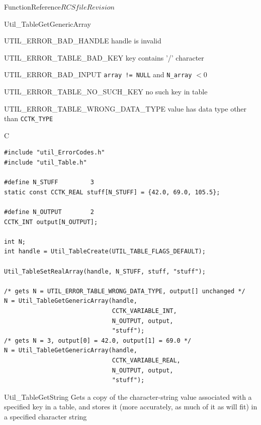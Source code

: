 \begin{cactuspart}{FunctionReference}{$RCSfile$}{$Revision$}
\begin{FunctionDescription}{Util\_TableGetGenericArray}
\begin{ErrorSection}
\begin{Error}{UTIL\_ERROR\_BAD\_HANDLE}
handle is invalid
\end{Error}
\begin{Error}{UTIL\_ERROR\_TABLE\_BAD\_KEY}
key contains '/' character
\end{Error}
\begin{Error}{UTIL\_ERROR\_BAD\_INPUT}
\verb|array != NULL| and \verb|N_array| $< 0$
\end{Error}
\begin{Error}{UTIL\_ERROR\_TABLE\_NO\_SUCH\_KEY}
no such key in table
\end{Error}
\begin{Error}{UTIL\_ERROR\_TABLE\_WRONG\_DATA\_TYPE}
value has data type other than \verb|CCTK_TYPE|
\end{Error}
\end{ErrorSection}

\begin{ExampleSection}
\begin{Example}{C}
\begin{verbatim}
#include "util_ErrorCodes.h"
#include "util_Table.h"

#define N_STUFF         3
static const CCTK_REAL stuff[N_STUFF] = {42.0, 69.0, 105.5};

#define N_OUTPUT        2
CCTK_INT output[N_OUTPUT];

int N;
int handle = Util_TableCreate(UTIL_TABLE_FLAGS_DEFAULT);

Util_TableSetRealArray(handle, N_STUFF, stuff, "stuff");

/* gets N = UTIL_ERROR_TABLE_WRONG_DATA_TYPE, output[] unchanged */
N = Util_TableGetGenericArray(handle,
                              CCTK_VARIABLE_INT,
                              N_OUTPUT, output,
                              "stuff");
/* gets N = 3, output[0] = 42.0, output[1] = 69.0 */
N = Util_TableGetGenericArray(handle,
                              CCTK_VARIABLE_REAL,
                              N_OUTPUT, output,
                              "stuff");
\end{verbatim}
\end{Example}
\end{ExampleSection}
\end{FunctionDescription}


\begin{FunctionDescription}{Util\_TableGetString}
\label{Util-TableGetString}
Gets a copy of the character-string value associated with a specified
key in a table, and stores it (more accurately, as much of it as will fit)
in a specified character string


\end{FunctionDescription}
\end{cactuspart}
